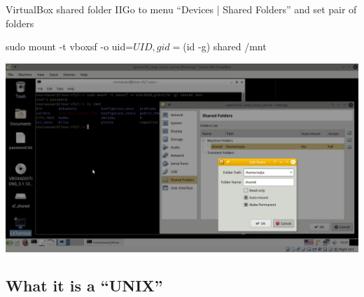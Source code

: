 \documentclass[compress, ucs, xelatex, 11pt, xcolor=svgnames,
  hyperref={
    bookmarks=true,
    unicode=true,
    colorlinks=true,
    pdftitle={Linux, command line and MetaCentrum},
    plainpages=false,
    pdfauthor={Vojtech Zeisek},
    pdfsubject={Course about use of Linux command line, writing shell scripts and using MetaCentrum of CESNET},
    pdfcreator={XeLaTeX},
    pdfkeywords={Linux, GNU, BASH, shell, command line, MetaCentrum},
    linkcolor=DarkRed,
    anchorcolor=DarkBlue,
    citecolor=Indigo,
    filecolor=NavyBlue,
    menucolor=DarkMagenta,
    urlcolor=DarkBlue,
    pdftex},
  url={hyphens, lowtilde} %
  ]{beamer}
\begin{document}
\begin{frame}[fragile]{VirtualBox shared folder II}{Go to menu ``Devices | Shared Folders'' and set pair of folders}
  \begin{bashcode}
    sudo mount -t vboxsf -o uid=$UID,gid=$(id -g) shared /mnt
  \end{bashcode}
  \vfil
  \begin{center}
    \includegraphics[width=\textwidth-1cm]{virtualbox_shared_folder_2.png}
  \end{center}
  \vfill
\end{frame}

\subsection{What it is a ``UNIX''}
\end{document}
